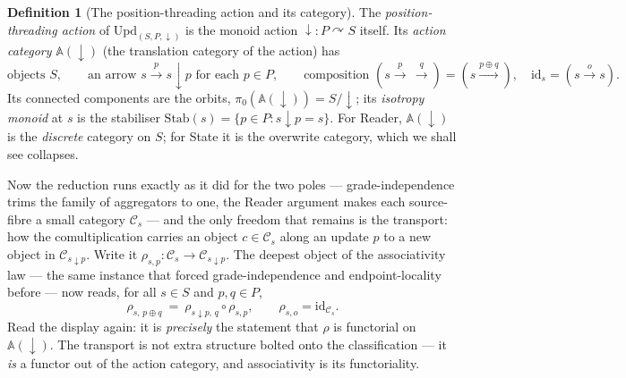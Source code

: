 \documentclass[11pt,a4paper]{book}
\newcommand{\id}{\mathrm{id}}
\theoremstyle{plain}
\theoremstyle{definition}
\newtheorem{Definition}[Theorem]{Definition}
\theoremstyle{remark}
\begin{document}
\begin{Definition}[The position-threading action and its category]\label{def:action-category}
The \emph{position-threading action} of $\mathrm{Upd}_{(S,P,\downarrow)}$ is the monoid action
$\downarrow\colon P\curvearrowright S$ itself. Its \emph{action category} $\mathbb A(\downarrow)$ (the
translation category of the action) has
\[
  \text{objects } S,\qquad
  \text{an arrow } s\xrightarrow{\ p\ } s{\downarrow}p \text{ for each } p\in P,\qquad
  \text{composition } (s\xrightarrow{p}\,\xrightarrow{q}) = (s\xrightarrow{p\oplus q}),\quad
  \id_{s}=(s\xrightarrow{o}s).
\]
Its connected components are the orbits, $\pi_{0}(\mathbb A(\downarrow))=S/{\downarrow}$; its
\emph{isotropy monoid} at $s$ is the stabiliser $\mathrm{Stab}(s)=\{p\in P:s{\downarrow}p=s\}$.
For Reader, $\mathbb A(\downarrow)$ is the \emph{discrete} category on $S$; for State it is the
overwrite category, which we shall see collapses.
\end{Definition}

Now the reduction runs exactly as it did for the two poles --- grade-independence trims the family of
aggregators to one, the Reader argument makes each source-fibre a small category $\mathcal C_{s}$ --- and
the only freedom that remains is the transport: how the comultiplication carries an object
$c\in\mathcal C_{s}$ along an update $p$ to a new object in $\mathcal C_{s{\downarrow}p}$. Write it
$\rho_{s,p}\colon\mathcal C_{s}\to\mathcal C_{s{\downarrow}p}$. The deepest object of the associativity
law --- the same instance that forced grade-independence and endpoint-locality before --- now reads, for
all $s\in S$ and $p,q\in P$,
\[
   \rho_{s,\,p\oplus q}\ =\ \rho_{s{\downarrow}p,\,q}\circ\rho_{s,p},
   \qquad \rho_{s,o}=\id_{\mathcal C_{s}}.
\]
Read the display again: it is \emph{precisely} the statement that $\rho$ is functorial on
$\mathbb A(\downarrow)$. The transport is not extra structure bolted onto the classification --- it
\emph{is} a functor out of the action category, and associativity is its functoriality.
\end{document}
